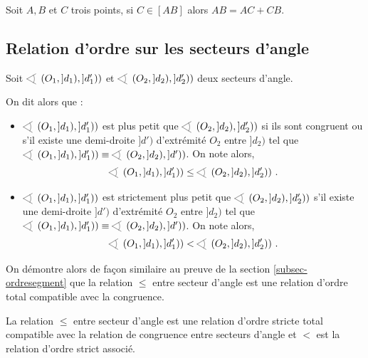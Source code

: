 \begin{prop}\label{prop-addlong}
    Soit $A,B$ et $C$ trois points, si $C\in [AB]$ alors $AB = AC + CB$.
\end{prop}

        \subsection{Relation d'ordre sur les secteurs d'angle}

\begin{defi}
    Soit $\anglesaillant\left(O_1,]d_1),]d_1')\right)$ et $\anglesaillant\left(O_2,]d_2),]d_2')\right)$ deux secteurs d'angle.

    On dit alors que :
    \begin{itemize}[$\bullet$]
        \item $\anglesaillant\left(O_1,]d_1),]d_1')\right)$ est plus petit que $\anglesaillant\left(O_2,]d_2),]d_2')\right)$ si ils sont congruent ou s'il existe une demi-droite $]d')$ d'extrémité $O_2$ entre $]d_2)$ tel que $\anglesaillant\left(O_1,]d_1),]d_1')\right) \equiv \anglesaillant\left(O_2,]d_2),]d')\right)$. On note alors,
        \begin{equation*}
            \anglesaillant\left(O_1,]d_1),]d_1')\right) \leq \anglesaillant\left(O_2,]d_2),]d_2')\right)\,.
        \end{equation*}
        \item $\anglesaillant\left(O_1,]d_1),]d_1')\right)$ est strictement plus petit que $\anglesaillant\left(O_2,]d_2),]d_2')\right)$ s'il existe une demi-droite $]d')$ d'extrémité $O_2$ entre $]d_2)$ tel que $\anglesaillant\left(O_1,]d_1),]d_1')\right) \equiv \anglesaillant\left(O_2,]d_2),]d')\right)$. On note alors,
        \begin{equation*}
            \anglesaillant\left(O_1,]d_1),]d_1')\right) < \anglesaillant\left(O_2,]d_2),]d_2')\right)\,.
        \end{equation*}
    \end{itemize}
\end{defi}
\begin{rema}
    On démontre alors de façon similaire au preuve de la section \ref{subsec-ordresegment} que la relation $\leq$ entre secteur d'angle est une relation d'ordre total compatible avec la congruence.   
\end{rema}
\begin{thm}\label{thm-ineqsegmentrelationordre}
    La relation $\leq$ entre secteur d'angle est une relation d'ordre stricte total compatible avec la relation de congruence entre secteurs d'angle et $<$ est la relation d'ordre strict associé. 
\end{thm}

